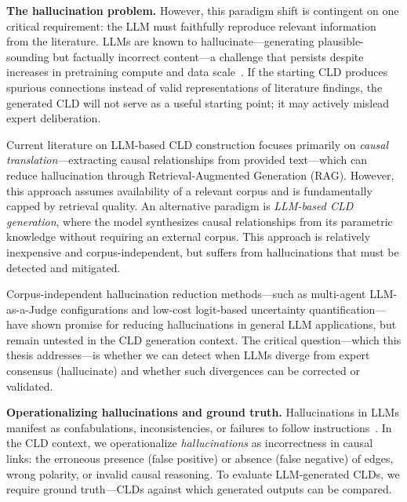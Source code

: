 \medskip
\noindent
\textbf{The hallucination problem.} However, this paradigm shift is contingent on one critical requirement: the LLM must faithfully reproduce relevant information from the literature. LLMs are known to hallucinate---generating plausible-sounding but factually incorrect content---a challenge that persists despite increases in pretraining compute and data scale~\citep{kalai2025languagemodelshallucinate, xu2025hallucination}. If the starting CLD produces spurious connections instead of valid representations of literature findings, the generated CLD will not serve as a useful starting point; it may actively mislead expert deliberation.

Current literature on LLM-based CLD construction focuses primarily on \emph{causal translation}---extracting causal relationships from provided text---which can reduce hallucination through Retrieval-Augmented Generation (RAG). However, this approach assumes availability of a relevant corpus and is fundamentally capped by retrieval quality. An alternative paradigm is \emph{LLM-based CLD generation}, where the model synthesizes causal relationships from its parametric knowledge without requiring an external corpus. This approach is relatively inexpensive and corpus-independent, but suffers from hallucinations that must be detected and mitigated.

Corpus-independent hallucination reduction methods---such as multi-agent LLM-as-a-Judge configurations and low-cost logit-based uncertainty quantification---have shown promise for reducing hallucinations in general LLM applications, but remain untested in the CLD generation context. The critical question---which this thesis addresses---is whether we can detect when LLMs diverge from expert consensus (hallucinate) and whether such divergences can be corrected or validated.

\medskip
\noindent
\textbf{Operationalizing hallucinations and ground truth.} Hallucinations in LLMs manifest as confabulations, inconsistencies, or failures to follow instructions~\citep{ji2023survey, huang2025hallucination}. In the CLD context, we operationalize \emph{hallucinations} as incorrectness in causal links: the erroneous presence (false positive) or absence (false negative) of edges, wrong polarity, or invalid causal reasoning. To evaluate LLM-generated CLDs, we require ground truth---CLDs against which generated outputs can be compared.

